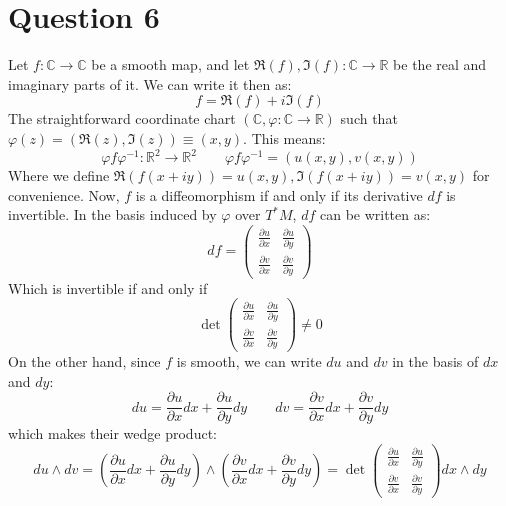 \documentclass{article}
\newcommand{\R}{\ensuremath{\mathbb{R}}}
\begin{document}
\section*{Question 6}
Let $f: \mathbb{C}\rightarrow\mathbb{C}$ be a smooth map, and let $\Re(f), \Im(f): \mathbb{C}\rightarrow \R$ be the real and imaginary parts of it. We can write it then as:
\begin{equation}
    f = \Re(f) + i\Im(f)
\end{equation}
The straightforward coordinate chart $(\mathbb{C}, \varphi: \mathbb{C} \rightarrow \R)$ such that $\varphi(z) = (\Re(z), \Im(z)) \equiv (x, y)$. This means:
\begin{equation}
    \varphi f \varphi^{-1}: \R^2 \rightarrow \R^2 \qquad
    \varphi f \varphi^{-1} = (u(x,y), v(x,y)) 
\end{equation}
Where we define $\Re(f(x+iy)) = u(x,y), \Im(f(x+iy)) = v(x,y)$ for convenience.
Now, $f$ is a diffeomorphism if and only if its derivative $df$ is invertible. In the basis induced by $\varphi$ over $T^*M$, $df$ can be written as:
\begin{equation}
    df = 
    \begin{pmatrix}
        \frac{\partial u}{\partial x} & \frac{\partial u}{\partial y} \\ \frac{\partial v}{\partial x} & \frac{\partial v}{\partial y}
    \end{pmatrix}
\end{equation}
Which is invertible if and only if
\begin{equation}
    \det\begin{pmatrix}
        \frac{\partial u}{\partial x} & \frac{\partial u}{\partial y} \\ \frac{\partial v}{\partial x} & \frac{\partial v}{\partial y}
    \end{pmatrix} \ne 0
\end{equation}
On the other hand, since $f$ is smooth, we can write $du$ and $dv$ in the basis of $dx$ and $dy$:
\begin{equation}
    du = \frac{\partial u}{\partial x}dx + \frac{\partial u}{\partial y}dy \qquad dv = \frac{\partial v}{\partial x}dx + \frac{\partial v}{\partial y}dy
\end{equation}
which makes their wedge product:
\begin{equation}
    du \wedge dv = \left(
        \frac{\partial u}{\partial x}dx + \frac{\partial u}{\partial y}dy
    \right) \wedge
    \left(
        \frac{\partial v}{\partial x}dx + \frac{\partial v}{\partial y}dy
    \right) = \det\begin{pmatrix}
        \frac{\partial u}{\partial x} & \frac{\partial u}{\partial y} \\ \frac{\partial v}{\partial x} & \frac{\partial v}{\partial y}
    \end{pmatrix} dx \wedge dy
\end{equation}
\end{document}
